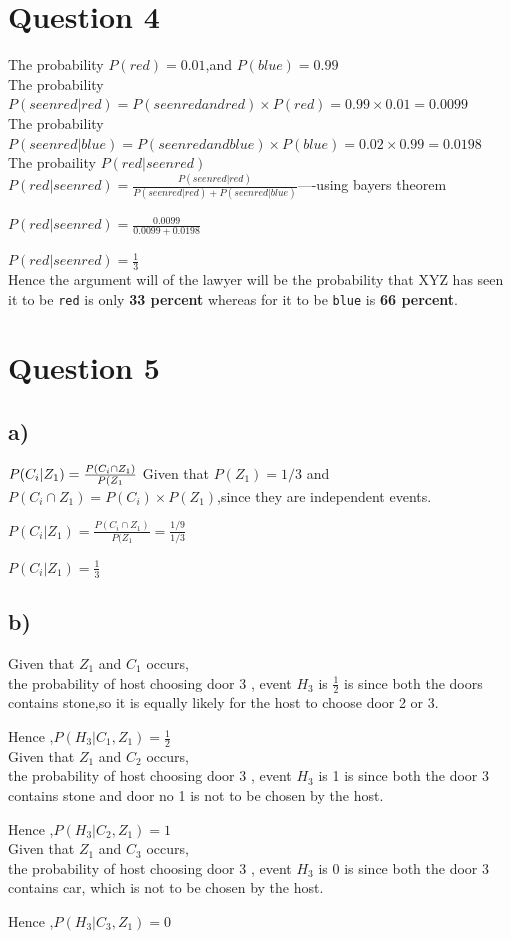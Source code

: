 \documentclass{article}
\begin{document}
\section*{Question 4}
    The probability $P(red)=0.01$,and $P(blue)=0.99$\\
    The probability $P(seenred|red)=P(seenred and red)\times P(red)=0.99\times 0.01= 0.0099$\\
    The probability $P(seenred|blue)=P(seenred and blue)\times P(blue)=0.02\times 0.99=0.0198$\\
    The probaility $P(red|seenred)$\\
    $P(red|seenred)=\frac{P(seenred|red)}{P(seenred|red)+P(seenred|blue)}$----using bayers theorem\par
    $P(red|seenred)=\frac{0.0099}{0.0099+0.0198}$\par 
    $P(red|seenred)=\frac{1}{3}$\\
    Hence the argument will of the lawyer will be the probability that XYZ has seen it to be \texttt{red} is only \textbf{33 percent} whereas for it to be \texttt{blue} is \textbf{66 percent}.
\section*{Question 5}   
\subsection*{a)}
    $P(C_i|Z_1)=\frac{P(C_i \cap Z_1)}{P(Z_1}\\$
    Given that $P(Z_1)=1/3$ and $P(C_i \cap Z_1)=P(C_i)\times P(Z_1)$,since they are independent events.
    \par 
    $P(C_i|Z_1)=\frac{P(C_i \cap Z_1)}{P(Z_1}=\frac{1/9}{1/3}$
    \par 
    $P(C_i|Z_1)=\frac{1}{3}$
\subsection*{b)}
    Given that $Z_1$ and $C_1$ occurs,\\
    the probability of host choosing door 3 , event $H_3$  is $\frac{1}{2}$ is since both the doors contains stone,so it is equally likely for the host to choose door 2 or 3.\par 
    Hence ,$P(H_3|C_1,Z_1)=\frac{1}{2}$\\
    Given that $Z_1$ and $C_2$ occurs,\\
    the probability of host choosing door 3 , event $H_3$  is 1 is since both the door 3 contains stone and door no 1 is not to be chosen by the host.\par
    Hence ,$P(H_3|C_2,Z_1)=1$\\
    Given that $Z_1$ and $C_3$ occurs,\\
    the probability of host choosing door 3 , event $H_3$  is 0 is since both the door 3 contains car, which is not to be chosen by the host.\par
    Hence ,$P(H_3|C_3,Z_1)=0$\\
\end{document}
